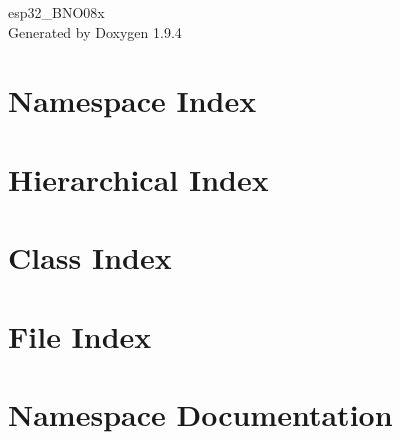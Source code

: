 \documentclass[twoside]{book}
\newcommand{\+}{\discretionary{\mbox{\scriptsize$\hookleftarrow$}}{}{}}
\newcommand{\clearemptydoublepage}{%
    \newpage{\pagestyle{empty}\cleardoublepage}%
  }
\begin{document}
  \raggedbottom
    \hypersetup{pageanchor=false,
                bookmarksnumbered=true,
                pdfencoding=unicode
               }
  \begin{titlepage}
  \vspace*{7cm}
  \begin{center}%
  {\Large esp32\+\_\+\+BNO08x}\\
  \vspace*{1cm}
  {\large Generated by Doxygen 1.9.4}\\
  \end{center}
  \end{titlepage}
  \clearemptydoublepage
  \tableofcontents
  \clearemptydoublepage
  \hypersetup{pageanchor=true}
\chapter{Namespace Index}

\chapter{Hierarchical Index}

\chapter{Class Index}

\chapter{File Index}

\chapter{Namespace Documentation}

\end{document}
